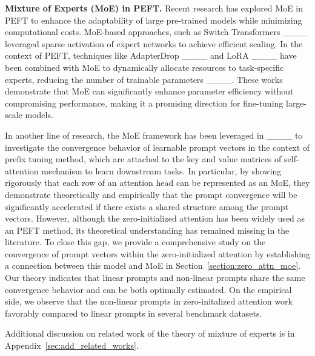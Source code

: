 \textbf{Mixture of Experts (MoE) in PEFT.} 
Recent research has explored MoE in PEFT to enhance the adaptability of large pre-trained models while minimizing computational costs. MoE-based approaches, such as Switch Transformers ____ leveraged sparse activation of expert networks to achieve efficient scaling. In the context of PEFT, techniques like AdapterDrop ____ and LoRA ____ have been combined with MoE to dynamically allocate resources to task-specific experts, reducing the number of trainable parameters ____. These works demonstrate that MoE can significantly enhance parameter efficiency without compromising performance, making it a promising direction for fine-tuning large-scale models.

In another line of research, the MoE framework has been leveraged in ____ to investigate the convergence behavior of learnable prompt vectors in the context of prefix tuning method, which are attached to the key and value matrices of self-attention mechanism to learn downstream tasks. 
In particular, by showing rigorously that each row of an attention head can be represented as an MoE, they demonstrate  theoretically and empirically that the prompt convergence will be significantly accelerated if there exists a shared structure among the prompt vectors. 
However, although the zero-initialized attention has been widely used as an PEFT method, its theoretical understanding has remained missing in the literature. To close this gap, we provide a comprehensive study on the convergence of prompt vectors within the zero-initialized attention by establishing a connection between this model and MoE in Section~\ref{section:zero_attn_moe}. Our theory indicates that linear prompts and non-linear prompts share the same convergence behavior and can be both optimally estimated. On the empirical side, we observe that the non-linear prompts in zero-initalized attention work favorably compared to linear prompts in several benchmark datasets.  

Additional discussion on related work of the theory of mixture of experts is in Appendix~\ref{sec:add_related_works}.

